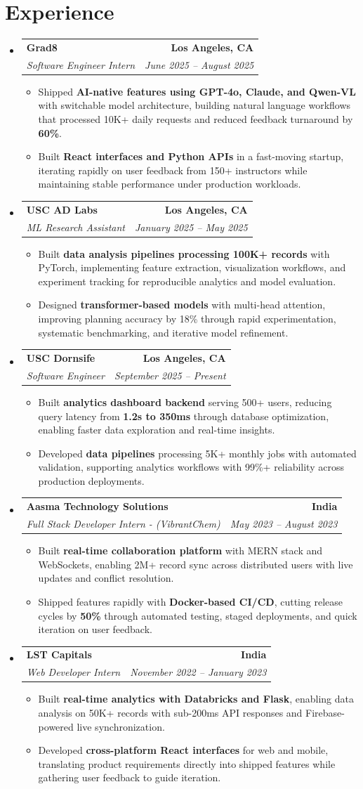 \documentclass[letterpaper,10pt]{article}
\makeatletter
\newcommand{\resumeItem}[1]{\item\small{{#1 \vspace{-2pt}}}}
\newcommand{\resumeSubheading}[4]{\vspace{-1pt}\item\begin{tabular*}{1.0\textwidth}[t]{l@{\extracolsep{\fill}}r}\textbf{#1} & \textbf{\small #2} \\\textit{\small#3} & \textit{\small #4} \\\end{tabular*}\vspace{-2pt}}
\newcommand{\resumeSubHeadingListStart}{\begin{itemize}[leftmargin=0.0in, label={}]}
\newcommand{\resumeSubHeadingListEnd}{\end{itemize}}
\newcommand{\resumeItemListStart}{\begin{itemize}[leftmargin=0.15in,label=\textbullet,itemsep=2pt,topsep=0pt,parsep=0pt,partopsep=0pt]}
\newcommand{\resumeItemListEnd}{\end{itemize}\vspace{-4pt}}
\makeatother
\begin{document}
\section{Experience}
\resumeSubHeadingListStart
\resumeSubheading{Grad8}{Los Angeles, CA}{Software Engineer Intern}{June 2025 -- August 2025}
\resumeItemListStart
\resumeItem{Shipped \textbf{AI-native features using GPT-4o, Claude, and Qwen-VL} with switchable model architecture, building natural language workflows that processed 10K+ daily requests and reduced feedback turnaround by \textbf{60\%}.}
\resumeItem{Built \textbf{React interfaces and Python APIs} in a fast-moving startup, iterating rapidly on user feedback from 150+ instructors while maintaining stable performance under production workloads.}
\resumeItemListEnd
\resumeSubheading{USC AD Labs}{Los Angeles, CA}{ML Research Assistant}{January 2025 -- May 2025}
\resumeItemListStart
\resumeItem{Built \textbf{data analysis pipelines processing 100K+ records} with PyTorch, implementing feature extraction, visualization workflows, and experiment tracking for reproducible analytics and model evaluation.}
\resumeItem{Designed \textbf{transformer-based models} with multi-head attention, improving planning accuracy by 18\% through rapid experimentation, systematic benchmarking, and iterative model refinement.}
\resumeItemListEnd
\resumeSubheading{USC Dornsife}{Los Angeles, CA}{Software Engineer}{September 2025 -- Present}
\resumeItemListStart
\resumeItem{Built \textbf{analytics dashboard backend} serving 500+ users, reducing query latency from \textbf{1.2s to 350ms} through database optimization, enabling faster data exploration and real-time insights.}
\resumeItem{Developed \textbf{data pipelines} processing 5K+ monthly jobs with automated validation, supporting analytics workflows with 99\%+ reliability across production deployments.}
\resumeItemListEnd
\resumeSubheading{Aasma Technology Solutions}{India}{Full Stack Developer Intern - (VibrantChem)}{May 2023 -- August 2023}
\resumeItemListStart
\resumeItem{Built \textbf{real-time collaboration platform} with MERN stack and WebSockets, enabling 2M+ record sync across distributed users with live updates and conflict resolution.}
\resumeItem{Shipped features rapidly with \textbf{Docker-based CI/CD}, cutting release cycles by \textbf{50\%} through automated testing, staged deployments, and quick iteration on user feedback.}
\resumeItemListEnd
\resumeSubheading{LST Capitals}{India}{Web Developer Intern}{November 2022 -- January 2023}
\resumeItemListStart
\resumeItem{Built \textbf{real-time analytics with Databricks and Flask}, enabling data analysis on 50K+ records with sub-200ms API responses and Firebase-powered live synchronization.}
\resumeItem{Developed \textbf{cross-platform React interfaces} for web and mobile, translating product requirements directly into shipped features while gathering user feedback to guide iteration.}
\resumeItemListEnd
\resumeSubHeadingListEnd
\vspace{-14pt}
\end{document}
